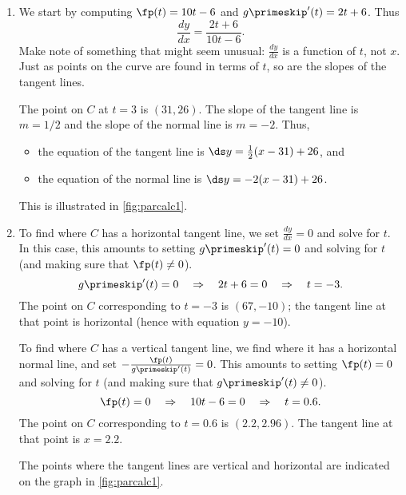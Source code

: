 {\begin{enumerate}
	\item We start by computing $\fp(t) = 10t-6$ and $g\primeskip'(t) =2t+6$. Thus \[\frac{dy}{dx} = \frac{2t+6}{10t-6}.\]
	Make note of something that might seem unusual: $\frac{dy}{dx}$ is a function of $t$, not $x$. Just as points on the curve are found in terms of $t$, so are the slopes of the tangent lines.

	The point on $C$ at $t=3$ is $(31,26)$. The slope of the tangent line is $m=1/2$ and the slope of the normal line is $m=-2$. Thus,
	\begin{itemize}
		\item the equation of the tangent line is $\ds y=\frac12(x-31)+26$, and
		\item	the equation of the normal line is $\ds y=-2(x-31)+26$.
	\end{itemize}
	This is illustrated in \autoref{fig:parcalc1}.


	\item	To find where $C$ has a horizontal tangent line, we set $\frac{dy}{dx}=0$ and solve for $t$. In this case, this amounts to setting $g\primeskip'(t)=0$ and solving for $t$ (and making sure that $\fp(t)\neq 0$). 
\[g\primeskip'(t)=0 \quad \Rightarrow \quad 2t+6=0 \quad \Rightarrow \quad t=-3.\]
	The point on $C$ corresponding to $t=-3$ is $(67,-10)$; the tangent line at that point is horizontal (hence with equation $y=-10$).
		
	To find where $C$ has a vertical tangent line, we find where it has a horizontal normal line, and set $-\frac{\fp(t)}{g\primeskip'(t)}=0$. This amounts to setting $\fp(t)=0$ and solving for $t$ (and making sure that $g\primeskip'(t)\neq 0$). 
	\[\fp(t)=0 \quad \Rightarrow \quad 10t-6=0 \quad \Rightarrow \quad t=0.6.\]
	The point on $C$ corresponding to $t=0.6$ is $(2.2,2.96)$. The tangent line at that point is $x=2.2$.
	
	The points where the tangent lines are vertical and horizontal are indicated on the graph in \autoref{fig:parcalc1}.\eoehere
\end{enumerate}}
	
